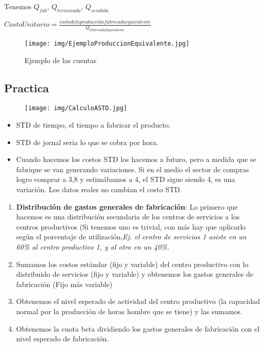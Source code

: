\documentclass[titlepage,a4paper]{article}
\begin{document}
Tenemos $Q_{fab}$, $Q_{terminada}$, $Q_{vendida}$

\medskip
\begin{math}
CostoUnitario= \frac{costo de la producción fabricada equivalente}{Q_{FabricadaEquivalente}}
\end{math}

\begin{figure}[!htb]
    \centering
    \texttt{[image: img/EjemploProduccionEquivalente.jpg]}
    \caption{Ejemplo de las cuentas}
\end{figure}

\subsection*{Practica}

\begin{figure}[!htb]
    \centering
    \texttt{[image: img/CalculoASTD.jpg]}
\end{figure}

\begin{itemize}
\item STD de tiempo, el tiempo a fabricar el producto.
\item STD de jornal seria lo que se cobra por hora.
\item Cuando hacemos los costos STD los hacemos a futuro, pero a medida que se fabrique se van generando variaciones. Si en el medio el sector de compras logro comprar a 3,8 y estimábamos a 4, el STD sigue siendo 4, es una variación. Los datos reales no cambian el costo STD. 
\end{itemize}


\begin{enumerate}
\item \textbf{Distribución de gastos generales de fabricación}: Lo primero que hacemos es una distribución secundaria de los centros de servicios a los centros productivos (Si tenemos uno es trivial, con más hay que aplicarlo según el porcentaje de utilización,\textit{Ej. el centro de servicios 1 asiste en un 60\% al centro productivo 1, y al otro en un 40\%.}
\item Sumamos los costos estándar (fijo y variable) del centro productivo con lo distribuido de servicios (fijo y variable) y obtenemos los gastos generales de fabricación (Fijo más variable)
\item Obtenemos el nivel esperado de actividad del centro productivo (la capacidad normal por la producción de horas hombre que se tiene) y las sumamos.
\item Obtenemos la cuota beta dividiendo los gastos generales de fabricación con el nivel esperado de fabricación.
\end{enumerate}
\end{document}

